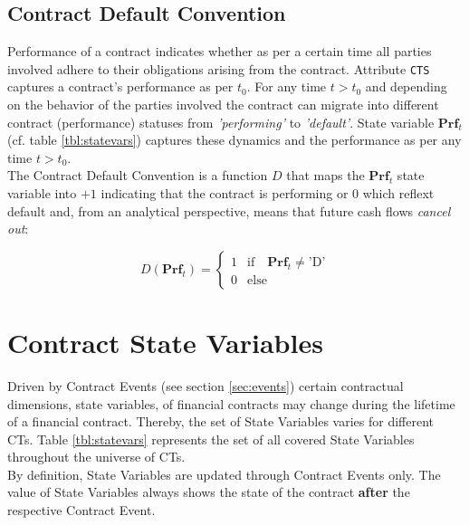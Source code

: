 \documentclass[9pt,oneside]{amsart}
\newcommand{\svar}[2]{\textbf{#1}_{#2}}
\newcommand{\attr}[1]{\texttt{#1}}
\newcommand{\dfl}[1]{D(\textbf{Prf}_{#1})}
\begin{document}
\begin{multicols}{2}
\subsection{Contract Default Convention}

Performance of a contract indicates whether as per a certain time all parties involved adhere to their obligations arising from the contract. Attribute \attr{CTS} captures a contract's performance as per $t_0$. For any time $t>t_0$ and depending on the behavior of the parties involved the contract can migrate into different contract (performance) statuses from \textit{'performing'} to \textit{'default'}. State variable $\svar{Prf}{t}$ (cf. table \ref{tbl:statevars}) captures these dynamics and the performance as per any time $t>t_0$.\\

The Contract Default Convention is a function $D$ that maps the $\svar{Prf}{t}$ state variable into $+1$ indicating that the contract is performing or $0$ which reflext default and, from an analytical perspective, means that future cash flows \textit{cancel out}:

\[
\dfl{t} = \begin{cases} 1 & \text{if} \quad \svar{Prf}{t}\neq \text{'D'} \\
				0 & \text{else} \end{cases}
\]




\section{Contract State Variables}\label{sec:statevars}

Driven by Contract Events (see section \ref{sec:events}) certain contractual dimensions, state variables, of financial contracts may change during the lifetime of a financial contract. Thereby, the set of State Variables varies for different CTs. Table \ref{tbl:statevars} represents the set of all covered State Variables throughout the universe of CTs.\\

By definition, State Variables are updated through Contract Events only. The value of State Variables always shows the state of the contract \textbf{after} the respective Contract Event.






\end{multicols}
\end{document}
